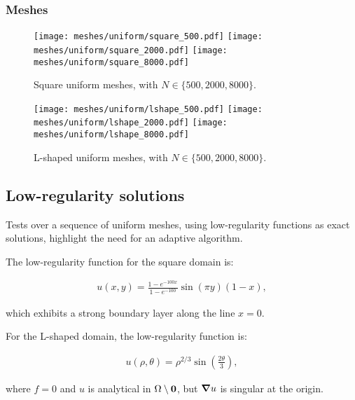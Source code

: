 \newpage
\subsubsection{Meshes}

\begin{figure}[!ht]
	\centering
	\texttt{[image: meshes/uniform/square\_500.pdf]}
	\texttt{[image: meshes/uniform/square\_2000.pdf]}
	\texttt{[image: meshes/uniform/square\_8000.pdf]}
	\caption{Square uniform meshes, with $N \in \{500, 2000, 8000\}$.}
\end{figure}

\begin{figure}[!ht]
	\centering
	\texttt{[image: meshes/uniform/lshape\_500.pdf]}
	\texttt{[image: meshes/uniform/lshape\_2000.pdf]}
	\texttt{[image: meshes/uniform/lshape\_8000.pdf]}
	\caption{L-shaped uniform meshes, with $N \in \{500, 2000, 8000\}$.}
\end{figure}

\newpage
\subsection{Low-regularity solutions}

Tests over a sequence of uniform meshes, using low-regularity functions as exact solutions, highlight the need for an adaptive algorithm.

\cite{Antonietti2013} The low-regularity function for the square domain is:

\begin{gather} \label{low-regularity_square}
    u(x, y) = \frac{1 - e^{-100x}}{1 - e^{-100}} \sin(\pi y) (1 - x),
\end{gather}

which exhibits a strong boundary layer along the line $x = 0$.

For the L-shaped domain, the low-regularity function is:

\begin{gather} \label{low-regularity_lshape}
    u(\rho, \theta) = \rho^{2 / 3} \sin\left(\frac{2 \theta}{3}\right),
\end{gather}

where $f = 0$ and $u$ is analytical in $\Omega \setminus \bm{0}$, but $\bm{\nabla}{u}$ is singular at the origin.

